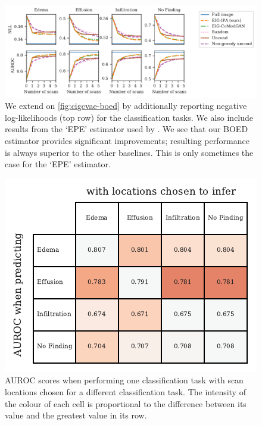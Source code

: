 \begin{figure}[t]
  \centering
  \includegraphics[width=\textwidth]{figs/cigcvae/boed-auroc-curve-supp}
  \caption{We extend on \cref{fig:cigcvae-boed} by additionally reporting negative
    log-likelihoods (top row) for the classification tasks. We also include
    results from the `EPE' estimator used by \citet{harvey2019near}. We see that
    our BOED estimator provides significant improvements; resulting performance
    is always superior to the other baselines. This is only sometimes the case
    for the `EPE' estimator. }
  \label{fig:cigcvae-boed-auroc-supp}
\end{figure}

\begin{figure}[t]
  \centering
  \includegraphics[width=\textwidth]{figs/cigcvae/table-AUROC-boed}
  \caption{AUROC scores when performing one classification task with scan
    locations chosen for a different classification task. The intensity of the
    colour of each cell is proportional to the difference between its value and
    the greatest value in its row.}
  \label{fig:cigcvae-boed-correlations}
\end{figure}

